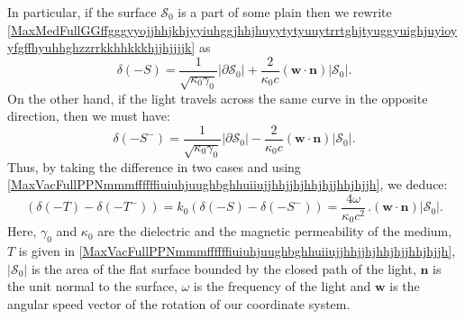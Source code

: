 \documentclass{article}
\theoremstyle{definition}
\theoremstyle{remark}
\renewcommand{\vec}[1]{\mathbf{#1}}
\newcommand{\er}{\eqref}
\newcommand{\er}{\eqref}
\begin{document}
In particular, if the surface $\mathcal{S}_0$ is a part of some
plain then we rewrite
\er{MaxMedFullGGffgggyyojjhhjkhjyyiuhggjhhjhuyytytyuuytrrtghjtyuggyuighjuyioyyfgffhyuhhghzzrrkkhhkkkhjjhjjjjk}
as
\begin{equation}\label{MaxMedFullGGffgggyyojjhhjkhjyyiuhggjhhjhuyytytyuuytrrtghjtyuggyuighjuyioyyfgffhyuhhghzzrrkkhhkkkhjjhjjjjkjjkjljkl}
\delta(-S)=\frac{1}{\sqrt{\kappa_0\gamma_0}}\left|\partial
\mathcal{S}_0\right|+\frac{2}{\kappa_0 c} \left(\vec w\cdot\vec
n\right)\left|\mathcal{S}_0\right|.
\end{equation}
On the other hand, if the light travels across the same curve in the
opposite direction, then we must have:
\begin{equation}\label{MaxMedFullGGffgggyyojjhhjkhjyyiuhggjhhjhuyytytyuuytrrtghjtyuggyuighjuyioyyfgffhyuhhghzzrrkkhhkkkhjjhjjjjkjjkjljklpoo}
\delta(-S^-)=\frac{1}{\sqrt{\kappa_0\gamma_0}}\left|\partial
\mathcal{S}_0\right|-\frac{2}{\kappa_0 c} \left(\vec w\cdot\vec
n\right)\left|\mathcal{S}_0\right|.
\end{equation}
Thus, by taking the difference in two cases and using
\er{MaxVacFullPPNmmmffffffiuiuhjuughbghhuiiujjhhjjhjhhjhjjhhjhjjh},
we deduce:
\begin{equation}\label{MaxMedFullGGffgggyyojjhhjkhjyyiuhggjhhjhuyytytyuuytrrtghjtyuggyuighjuyioyyfgffhyuhhghzzrrkkhhkkkhjjhjjjjkjjkjljklkkkhjhj}
\left(\delta(-T)-\delta(-T^-)\right)=k_0\left(\delta(-S)-\delta(-S^-)\right)=\frac{4\omega}{\kappa_0
c^2}\,. \left(\vec w\cdot\vec n\right)\left|\mathcal{S}_0\right|.
\end{equation}
Here, $\gamma_0$ and $\kappa_0$ are the dielectric and the magnetic
permeability of the medium, $T$ is given in
\er{MaxVacFullPPNmmmffffffiuiuhjuughbghhuiiujjhhjjhjhhjhjjhhjhjjh},
$\left|\mathcal{S}_0\right|$ is the area of the flat surface bounded
by the closed path of the light, $\vec n$ is the unit normal to the
surface, $\omega$ is the frequency of the light and $\vec w$ is the
angular speed vector of the rotation of our coordinate system.
%
%
%
\begin{comment}
Note that by the previous subsections the exact curve of traveling
of light depends on $\vec w$. In particular, the curves of traveling
in direct and in opposite directions are not exactly the same.
However, by
\er{MaxMedFullGGffgggyyojjhhjkhjyyiuhggjhhjhuyytytyuuytrrtghjtyuggyuighjuyioyyfgffhyuhhghzzrrkkhhkkkhhhjhkjhhghhgghiuiuhhjhjiuiuyuyyukklghhgjkjkiuuuioiojo}
the correction should be of the order
\begin{equation}\label{MaxMedFullGGffgggyyojjhhjkhjyyiuhggjhhjhuyytytyuuytrrtghjtyuggyuighjuyioyyfgffhyuhhghzzrrkkhhkkkhhhjhkjhhghhgghiuiuhhjhjiuiuyuyyukklghhgjkjkiuuuioiojouiiuiuiu}
\left|\partial \mathcal{S}_0\right|O\left(\frac{2|\vec
w|\left|\partial \mathcal{S}_0\right|}{c}\right).
\end{equation}
\end{comment}
\end{document}
